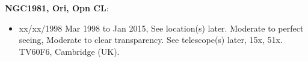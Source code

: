 {\bf NGC1981, Ori, Opn CL}:
\begin{itemize}
\item xx/xx/1998 Mar 1998 to Jan 2015, See location(s) later. Moderate to perfect seeing, Moderate to clear transparency. See telescope(s) later, 15x, 51x. TV60F6, Cambridge (UK).
\end{itemize}
